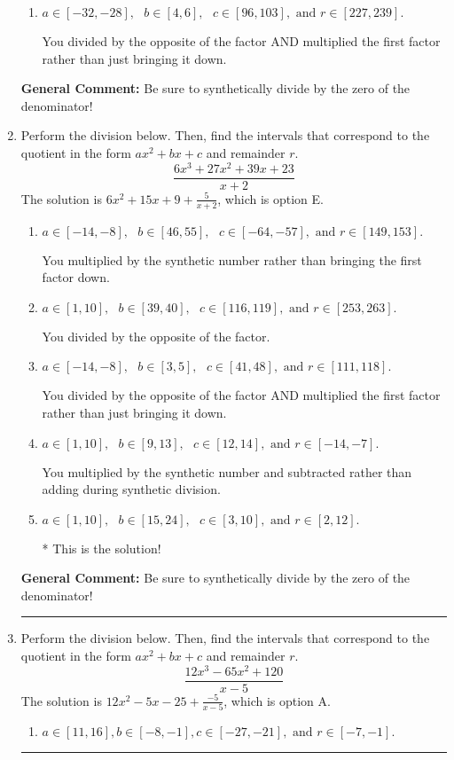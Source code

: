 \documentclass{extbook}[14pt]
\newcommand{\litem}[1]{\item #1

\rule{\textwidth}{0.4pt}}
\begin{document}
\begin{enumerate}
{\begin{enumerate}[label=\Alph*.]
 You multiplied by the synthetic number rather than bringing the first factor down.
\item \( a \in [-32, -28], \text{   } b \in [4, 6], \text{   } c \in [96, 103], \text{   and   } r \in [227, 239]. \)

 You divided by the opposite of the factor AND multiplied the first factor rather than just bringing it down.
\end{enumerate}

\textbf{General Comment:} Be sure to synthetically divide by the zero of the denominator!
}
\litem{
Perform the division below. Then, find the intervals that correspond to the quotient in the form $ax^2+bx+c$ and remainder $r$.
\[ \frac{6x^{3} +27 x^{2} +39 x + 23}{x + 2} \]The solution is \( 6x^{2} +15 x + 9 + \frac{5}{x + 2} \), which is option E.\begin{enumerate}[label=\Alph*.]
\item \( a \in [-14, -8], \text{   } b \in [46, 55], \text{   } c \in [-64, -57], \text{   and   } r \in [149, 153]. \)

 You multiplied by the synthetic number rather than bringing the first factor down.
\item \( a \in [1, 10], \text{   } b \in [39, 40], \text{   } c \in [116, 119], \text{   and   } r \in [253, 263]. \)

 You divided by the opposite of the factor.
\item \( a \in [-14, -8], \text{   } b \in [3, 5], \text{   } c \in [41, 48], \text{   and   } r \in [111, 118]. \)

 You divided by the opposite of the factor AND multiplied the first factor rather than just bringing it down.
\item \( a \in [1, 10], \text{   } b \in [9, 13], \text{   } c \in [12, 14], \text{   and   } r \in [-14, -7]. \)

 You multiplied by the synthetic number and subtracted rather than adding during synthetic division.
\item \( a \in [1, 10], \text{   } b \in [15, 24], \text{   } c \in [3, 10], \text{   and   } r \in [2, 12]. \)

* This is the solution!
\end{enumerate}

\textbf{General Comment:} Be sure to synthetically divide by the zero of the denominator!
}
\litem{
Perform the division below. Then, find the intervals that correspond to the quotient in the form $ax^2+bx+c$ and remainder $r$.
\[ \frac{12x^{3} -65 x^{2} + 120}{x -5} \]The solution is \( 12x^{2} -5 x -25 + \frac{-5}{x -5} \), which is option A.\begin{enumerate}[label=\Alph*.]
\item \( a \in [11, 16], b \in [-8, -1], c \in [-27, -21], \text{ and } r \in [-7, -1]. \)


\end{enumerate}}
\end{enumerate}
\end{document}
